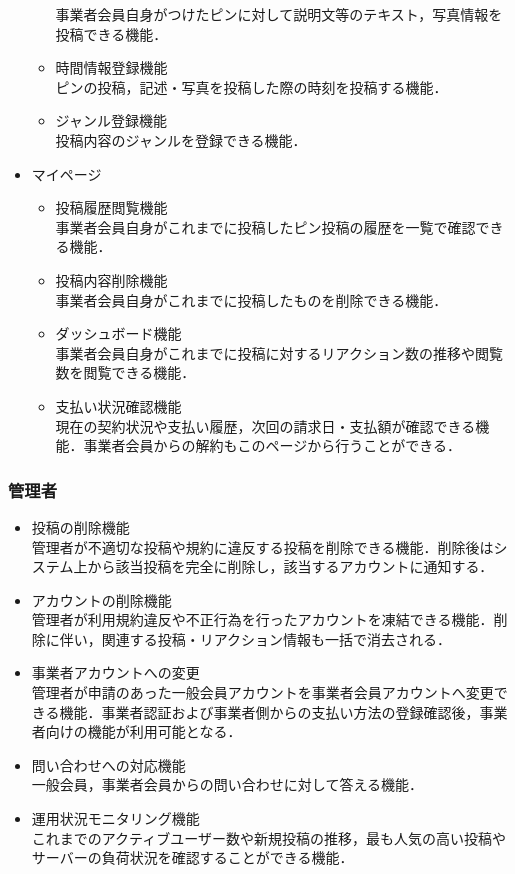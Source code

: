 \begin{itemize}[itemsep=10pt]
\begin{itemize}[itemsep=10pt]
        事業者会員自身がつけたピンに対して説明文等のテキスト，写真情報を投稿できる機能．
        \item 時間情報登録機能 \mbox{}\\
        ピンの投稿，記述・写真を投稿した際の時刻を投稿する機能．
        \item ジャンル登録機能 \mbox{}\\
        投稿内容のジャンルを登録できる機能．
    \end{itemize}
    \item マイページ
    \begin{itemize}[itemsep=10pt]
        \item 投稿履歴閲覧機能 \mbox{}\\
        事業者会員自身がこれまでに投稿したピン投稿の履歴を一覧で確認できる機能．
        \item 投稿内容削除機能 \mbox{}\\
        事業者会員自身がこれまでに投稿したものを削除できる機能．
        \item ダッシュボード機能 \mbox{} \\
        事業者会員自身がこれまでに投稿に対するリアクション数の推移や閲覧数を閲覧できる機能．
        \item 支払い状況確認機能 \mbox{} \\
        現在の契約状況や支払い履歴，次回の請求日・支払額が確認できる機能．事業者会員からの解約もこのページから行うことができる．
    \end{itemize}
\end{itemize}

\subsubsection{管理者}
\begin{itemize}[itemsep=10pt]
    \item 投稿の削除機能 \mbox{}\\
    管理者が不適切な投稿や規約に違反する投稿を削除できる機能．削除後はシステム上から該当投稿を完全に削除し，該当するアカウントに通知する．
    \item アカウントの削除機能 \mbox{}\\
    管理者が利用規約違反や不正行為を行ったアカウントを凍結できる機能．削除に伴い，関連する投稿・リアクション情報も一括で消去される．
    \item 事業者アカウントへの変更 \mbox{}\\
    管理者が申請のあった一般会員アカウントを事業者会員アカウントへ変更できる機能．事業者認証および事業者側からの支払い方法の登録確認後，事業者向けの機能が利用可能となる．
    \item 問い合わせへの対応機能 \mbox{} \\
    一般会員，事業者会員からの問い合わせに対して答える機能．
    \item 運用状況モニタリング機能 \mbox{} \\
    これまでのアクティブユーザー数や新規投稿の推移，最も人気の高い投稿やサーバーの負荷状況を確認することができる機能．
\end{itemize}

